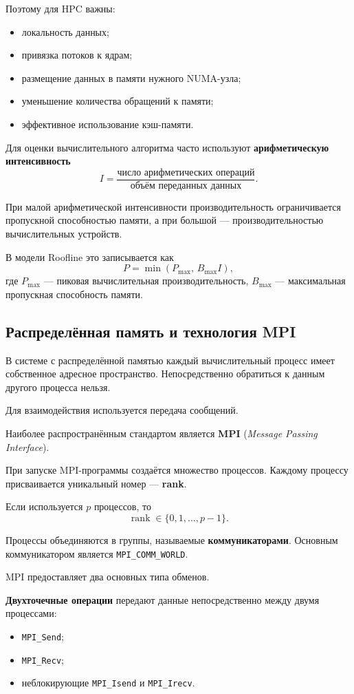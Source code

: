 Поэтому для HPC важны:
\begin{itemize}
	\item локальность данных;
	\item привязка потоков к ядрам;
	\item размещение данных в памяти нужного NUMA-узла;
	\item уменьшение количества обращений к памяти;
	\item эффективное использование кэш-памяти.
\end{itemize}

Для оценки вычислительного алгоритма часто используют
\textbf{арифметическую интенсивность}
\[
I =
\frac{\text{число арифметических операций}}
{\text{объём переданных данных}}.
\]

При малой арифметической интенсивности производительность ограничивается
пропускной способностью памяти, а при большой --- производительностью
вычислительных устройств.

В модели Roofline это записывается как
\[
P =
\min\left(P_{\max},\, B_{\max} I\right),
\]
где $P_{\max}$ --- пиковая вычислительная производительность,
$B_{\max}$ --- максимальная пропускная способность памяти.

\subsection{Распределённая память и технология MPI}

В системе с распределённой памятью каждый вычислительный процесс имеет
собственное адресное пространство. Непосредственно обратиться к данным другого
процесса нельзя.

Для взаимодействия используется передача сообщений.

Наиболее распространённым стандартом является
\textbf{MPI} (\textit{Message Passing Interface}).

При запуске MPI-программы создаётся множество процессов.
Каждому процессу присваивается уникальный номер --- \textbf{rank}.

Если используется $p$ процессов, то
\[
\operatorname{rank} \in \{0,1,\ldots,p-1\}.
\]

Процессы объединяются в группы, называемые \textbf{коммуникаторами}.
Основным коммуникатором является \texttt{MPI\_COMM\_WORLD}.

MPI предоставляет два основных типа обменов.

\textbf{Двухточечные операции} передают данные непосредственно между двумя
процессами:
\begin{itemize}
	\item \texttt{MPI\_Send};
	\item \texttt{MPI\_Recv};
	\item неблокирующие \texttt{MPI\_Isend} и \texttt{MPI\_Irecv}.
\end{itemize}

